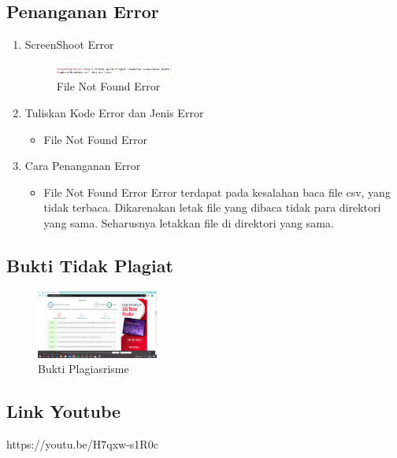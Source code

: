 \subsection{Penanganan Error}
\begin{enumerate}
\item ScreenShoot Error
	\begin{figure}[H]
		\includegraphics[width=4cm]{figures/1174054/4/error.png}
		\centering
		\caption{File Not Found Error}
	\end{figure}

	\item Tuliskan Kode Error dan Jenis Error
	\begin{itemize}
		\item File Not Found Error

	\end{itemize}
	\item Cara Penanganan Error
	\begin{itemize}
		\item File Not Found Error
		\hfill\break
		Error terdapat pada kesalahan baca file csv, yang tidak terbaca. Dikarenakan letak file yang dibaca tidak para direktori yang sama. Seharusnya letakkan file di direktori yang sama. 
	\end{itemize}
\end{enumerate}


\subsection{Bukti Tidak Plagiat}
\begin{figure}[H]
	\includegraphics[width=4cm]{figures/1174054/4/plagiarisme.png}
	\centering
	\caption{Bukti Plagiasrisme}
\end{figure}

\subsection{Link Youtube}
https://youtu.be/H7qxw-s1R0c
